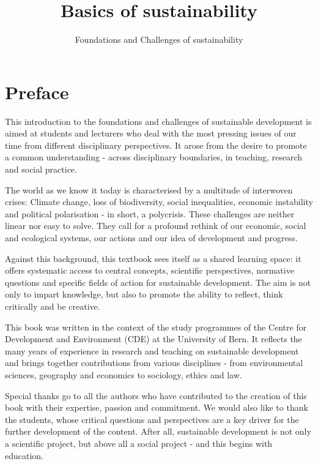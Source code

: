 \documentclass[
  a4paper,
  openany]{book}
\title{Basics of sustainability}
\subtitle{Foundations and Challenges of sustainability}
\author{}
\date{}
\renewcommand*\contentsname{Table of contents}
\newcommand\contentsname{Table of contents}
\begin{document}
\frontmatter
\maketitle

\renewcommand*\contentsname{Table of contents}
{
\hypersetup{linkcolor=}
\setcounter{tocdepth}{2}
\tableofcontents
}

\mainmatter
{}

\chapter*{Preface}\label{preface}


This introduction to the foundations and challenges of sustainable
development is aimed at students and lecturers who deal with the most
pressing issues of our time from different disciplinary perspectives. It
arose from the desire to promote a common understanding - across
disciplinary boundaries, in teaching, research and social practice.

The world as we know it today is characterised by a multitude of
interwoven crises: Climate change, loss of biodiversity, social
inequalities, economic instability and political polarisation - in
short, a polycrisis. These challenges are neither linear nor easy to
solve. They call for a profound rethink of our economic, social and
ecological systems, our actions and our idea of development and
progress.

Against this background, this textbook sees itself as a shared learning
space: it offers systematic access to central concepts, scientific
perspectives, normative questions and specific fields of action for
sustainable development. The aim is not only to impart knowledge, but
also to promote the ability to reflect, think critically and be
creative.

This book was written in the context of the study programmes of the
Centre for Development and Environment (CDE) at the University of Bern.
It reflects the many years of experience in research and teaching on
sustainable development and brings together contributions from various
disciplines - from environmental sciences, geography and economics to
sociology, ethics and law.

Special thanks go to all the authors who have contributed to the
creation of this book with their expertise, passion and commitment. We
would also like to thank the students, whose critical questions and
perspectives are a key driver for the further development of the
content. After all, sustainable development is not only a scientific
project, but above all a social project - and this begins with
education.
\end{document}
